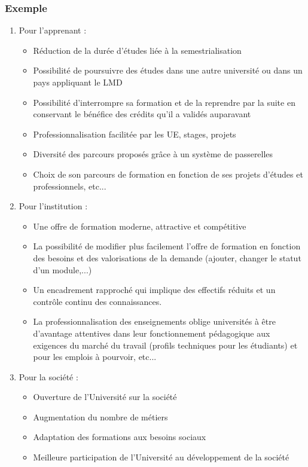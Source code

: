 \subsubsection{Exemple}
\begin{enumerate}
	\item Pour l'apprenant :
	\begin{itemize}
		\item [\textbullet] Réduction de la durée d'études liée à la semestrialisation
		\item [\textbullet] Possibilité de poursuivre des études dans une autre université ou dans un pays appliquant le LMD
		\item [\textbullet] Possibilité d'interrompre sa formation et de la reprendre par la suite en conservant le bénéfice des crédits qu'il a validés auparavant
		\item [\textbullet] Professionnalisation facilitée par les UE, stages, projets
		\item [\textbullet] Diversité des parcours proposés grâce à un système de passerelles
		\item [\textbullet] Choix de son parcours de formation en fonction de ses projets d'études et professionnels, etc...
	\end{itemize}
	\item Pour l'institution : 
	\begin{itemize}
		\item [\textbullet] Une offre de formation moderne, attractive et compétitive
		\item [\textbullet] La possibilité de modifier plus facilement l'offre de formation en fonction des besoins et des valorisations de la demande (ajouter, changer le statut d'un module,...)
		\item [\textbullet] Un encadrement rapproché qui implique des effectifs réduits et un contrôle continu des connaissances.
		\item [\textbullet] La professionnalisation des enseignements oblige universités à être d'avantage attentives dans leur fonctionnement pédagogique aux exigences du marché du travail (profils techniques pour les étudiants) et pour les emplois à pourvoir, etc...
	\end{itemize}
	\item Pour la société : 
	\begin{itemize}
		\item [\textbullet] Ouverture de l'Université sur la société
		\item [\textbullet] Augmentation du nombre de métiers
		\item [\textbullet] Adaptation des formations aux besoins sociaux
		\item [\textbullet] Meilleure participation de l'Université au développement de la société
	\end{itemize}
\end{enumerate}

